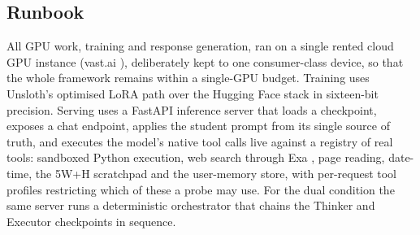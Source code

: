 \subsection{Runbook}
\label{subsec:mr-runbook}

All GPU work, training and response generation, ran on a single rented cloud GPU instance (vast.ai \cite{vastai}), deliberately kept to one consumer-class device, so that the whole framework remains within a single-GPU budget. Training uses Unsloth's optimised LoRA path \cite{unsloth2024} over the Hugging Face stack \cite{huggingfacetransformers} in sixteen-bit precision. Serving uses a FastAPI \cite{fastapi} inference server that loads a checkpoint, exposes a chat endpoint, applies the student prompt from its single source of truth, and executes the model's native tool calls live against a registry of real tools: sandboxed Python execution, web search through Exa \cite{exaai}, page reading, date-time, the 5W+H scratchpad and the user-memory store, with per-request tool profiles restricting which of these a probe may use. For the dual condition the same server runs a deterministic orchestrator that chains the Thinker and Executor checkpoints in sequence.

